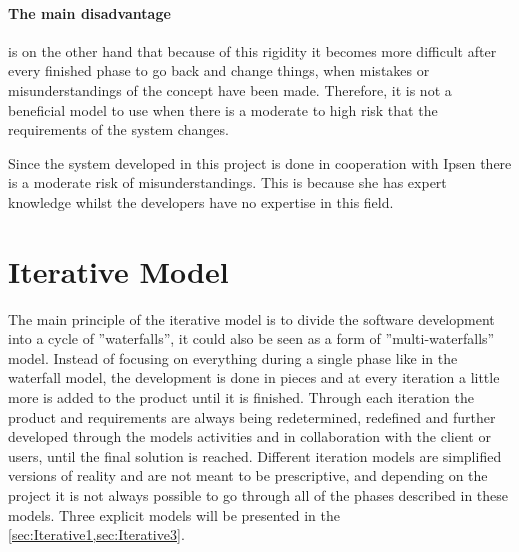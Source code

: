 \paragraph{The main disadvantage} is on the other hand that because of this rigidity it becomes more difficult after every finished phase to go back and change things, when mistakes or misunderstandings of the concept have been made.
Therefore, it is not a beneficial model to use when there is a moderate to high risk that the requirements of the system changes.

Since the system developed in this project is done in cooperation with Ipsen there is a moderate risk of misunderstandings.
This is because she has expert knowledge whilst the developers have no expertise in this field.


\section{Iterative Model} \label{sec:iterativModel}
The main principle of the iterative model \cite{Iterative-Toolsqa,InteractionDesign} is to divide the software development into a cycle of ''waterfalls'', it could also be seen as a form of ''multi-waterfalls'' model.
Instead of focusing on everything
during a single phase
like in the waterfall model, the development is done in pieces and at every iteration a little more is added to the product until it is finished.
Through each iteration the product and requirements are always being redetermined, redefined and further developed through the models activities and in collaboration with the client or users, until the final solution is reached.
Different iteration models are simplified versions of reality and are not meant to be prescriptive, and depending on the project it is not always possible to go through all of the phases described in these models.
Three explicit models will be presented in the \cref{sec:Iterative1,sec:Iterative3}.

